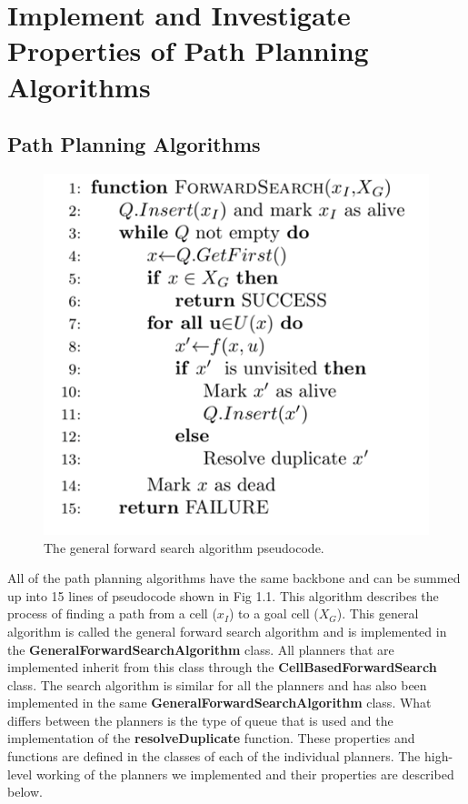 \documentclass[a4paper,12pt]{article}
\begin{document}
	\pagebreak
	
	\tableofcontents
	
	\pagebreak
	
	\section{Implement and Investigate Properties of Path Planning Algorithms}
		
	\subsection{Path Planning Algorithms}
			
			\begin{figure}[H]
				\renewcommand\thefigure{1.1}
				\centering
				
				\includegraphics[scale=0.6]{general_forward_search_pseudocode.png}
				\caption{The general forward search algorithm pseudocode. }
			\end{figure}
			
			All of the path planning algorithms have the same backbone and can be summed up into 15 lines of pseudocode shown in Fig 1.1. This algorithm describes the process of finding a path from a cell ($x_I$) to a goal cell ($X_G$). This general algorithm is called the general forward search algorithm and is implemented in the \textbf{GeneralForwardSearchAlgorithm} class. All planners that are implemented inherit from this class through the \textbf{CellBasedForwardSearch} class. The search algorithm is similar for all the planners and has also been implemented in the same \textbf{GeneralForwardSearchAlgorithm} class. What differs between the planners is the type of queue that is used and the implementation of the \textbf{resolveDuplicate} function. These properties and functions are defined in the classes of each of the individual planners. The high-level working of the planners we implemented and their properties are described below.
			
\end{document}
